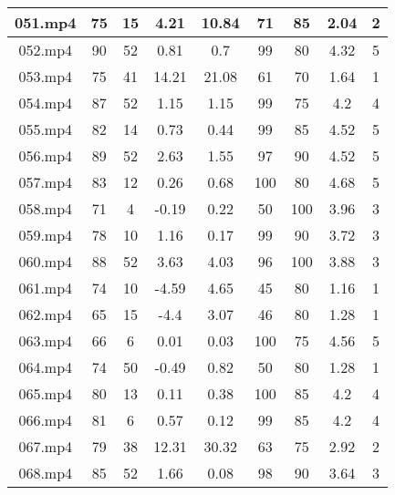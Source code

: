 \begin{enumerate}
\begin{longtable}{|c|c|c|c|c|c|c|c|c|}
		051.mp4 & 75      & 15      & 4.21    & 10.84     & 71          & 85          & 2.04 & 2     \\ \hline
		052.mp4 & 90      & 52      & 0.81    & 0.7       & 99          & 80          & 4.32 & 5     \\ \hline
		053.mp4 & 75      & 41      & 14.21   & 21.08     & 61          & 70          & 1.64 & 1     \\ \hline
		054.mp4 & 87      & 52      & 1.15    & 1.15      & 99          & 75          & 4.2  & 4     \\ \hline
		055.mp4 & 82      & 14      & 0.73    & 0.44      & 99          & 85          & 4.52 & 5     \\ \hline
		056.mp4 & 89      & 52      & 2.63    & 1.55      & 97          & 90          & 4.52 & 5     \\ \hline
		057.mp4 & 83      & 12      & 0.26    & 0.68      & 100         & 80          & 4.68 & 5     \\ \hline
		058.mp4 & 71      & 4       & -0.19   & 0.22      & 50          & 100         & 3.96 & 3     \\ \hline
		059.mp4 & 78      & 10      & 1.16    & 0.17      & 99          & 90          & 3.72 & 3     \\ \hline
		060.mp4 & 88      & 52      & 3.63    & 4.03      & 96          & 100         & 3.88 & 3     \\ \hline
		061.mp4 & 74      & 10      & -4.59   & 4.65      & 45          & 80          & 1.16 & 1     \\ \hline
		062.mp4 & 65      & 15      & -4.4    & 3.07      & 46          & 80          & 1.28 & 1     \\ \hline
		063.mp4 & 66      & 6       & 0.01    & 0.03      & 100         & 75          & 4.56 & 5     \\ \hline
		064.mp4 & 74      & 50      & -0.49   & 0.82      & 50          & 80          & 1.28 & 1     \\ \hline
		065.mp4 & 80      & 13      & 0.11    & 0.38      & 100         & 85          & 4.2  & 4     \\ \hline
		066.mp4 & 81      & 6       & 0.57    & 0.12      & 99          & 85          & 4.2  & 4     \\ \hline
		067.mp4 & 79      & 38      & 12.31   & 30.32     & 63          & 75          & 2.92 & 2     \\ \hline
		068.mp4 & 85      & 52      & 1.66    & 0.08      & 98          & 90          & 3.64 & 3     \\ \hline

\end{longtable}
\end{enumerate}
